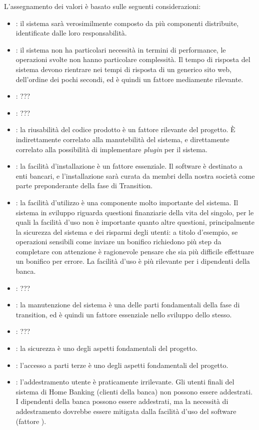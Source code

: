L'assegnamento dei valori \`e basato sulle seguenti considerazioni:
\begin{itemize}
	\item {}: il sistema sar\`a verosimilmente composto da pi\`u componenti distribuite, identificate dalle loro responsabilit\`a.
	\item {}: il sistema non ha particolari necessit\`a in termini di performance, le operazioni svolte non hanno particolare complessit\`a.
		Il tempo di risposta del sistema devono rientrare nei tempi di risposta di un generico sito web, dell'ordine dei pochi secondi, ed \`e quindi un fattore mediamente rilevante.
	\item {}: ???
	\item {}: ???
	\item {}: la riusabilit\`a del codice prodotto \`e un fattore rilevante del progetto.
		\`E indirettamente correlato alla manutebilit\`a del sistema, e direttamente correlato alla possibilit\`a di implementare \emph{plugin} per il sistema.
	\item {}: la facilit\`a d'installazione \`e un fattore essenziale.
		Il software \`e destinato a enti bancari, e l'installazione sar\`a curata da membri della nostra societ\`a come parte preponderante della fase di Transition.
	\item {}: la facilit\`a d'utilizzo \`e una componente molto importante del sistema.
		Il sistema in sviluppo riguarda questioni finanziarie della vita del singolo, per le quali la facilit\`a d'uso non \`e importante quanto altre questioni, principalmente la sicurezza del sistema e dei risparmi degli utenti: a titolo d'esempio, se operazioni sensibili come inviare un bonifico richiedono pi\`u step da completare con attenzione \`e ragionevole pensare che sia pi\`u difficile effettuare un bonifico per errore.
		La facilit\`a d'uso \`e pi\`u rilevante per i dipendenti della banca.
	\item {}: ???
	\item {}: la manutenzione del sistema \`e una delle parti fondamentali della fase di transition, ed \`e quindi un fattore essenziale nello sviluppo dello stesso.
	\item {}: ???
	\item {}: la sicurezza \`e uno degli aspetti fondamentali del progetto.
	\item {}: l'accesso a parti terze \`e uno degli aspetti fondamentali del progetto.
	\item {}: l'addestramento utente \`e praticamente irrilevante.
		Gli utenti finali del sistema di Home Banking (clienti della banca) non possono essere addestrati.
		I dipendenti della banca possono essere addestrati, ma la necessit\`a di addestramento dovrebbe essere mitigata dalla facilit\`a d'uso del software (fattore ).
\end{itemize}

